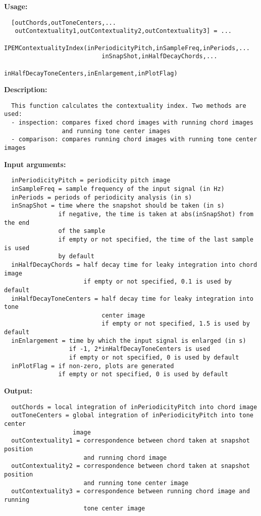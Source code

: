 \textbf{Usage:}
\begin{verbatim}  [outChords,outToneCenters,...
   outContextuality1,outContextuality2,outContextuality3] = ...
    IPEMContextualityIndex(inPeriodicityPitch,inSampleFreq,inPeriods,...
                           inSnapShot,inHalfDecayChords,...
                           inHalfDecayToneCenters,inEnlargement,inPlotFlag)

\end{verbatim}
\textbf{Description:}
\begin{verbatim}  This function calculates the contextuality index. Two methods are used:
  - inspection: compares fixed chord images with running chord images
                and running tone center images
  - comparison: compares running chord images with running tone center images

\end{verbatim}
\textbf{Input arguments:}
\begin{verbatim}  inPeriodicityPitch = periodicity pitch image
  inSampleFreq = sample frequency of the input signal (in Hz)
  inPeriods = periods of periodicity analysis (in s)
  inSnapShot = time where the snapshot should be taken (in s)
               if negative, the time is taken at abs(inSnapShot) from the end
               of the sample
               if empty or not specified, the time of the last sample is used
               by default
  inHalfDecayChords = half decay time for leaky integration into chord image
                      if empty or not specified, 0.1 is used by default
  inHalfDecayToneCenters = half decay time for leaky integration into tone
                           center image
                           if empty or not specified, 1.5 is used by default
  inEnlargement = time by which the input signal is enlarged (in s) 
                  if -1, 2*inHalfDecayToneCenters is used
                  if empty or not specified, 0 is used by default
  inPlotFlag = if non-zero, plots are generated
               if empty or not specified, 0 is used by default

\end{verbatim}
\textbf{Output:}
\begin{verbatim}  outChords = local integration of inPeriodicityPitch into chord image
  outToneCenters = global integration of inPeriodicityPitch into tone center
                   image
  outContextuality1 = correspondence between chord taken at snapshot position
                      and running chord image
  outContextuality2 = correspondence between chord taken at snapshot position
                      and running tone center image
  outContextuality3 = correspondence between running chord image and running
                      tone center image

\end{verbatim}

